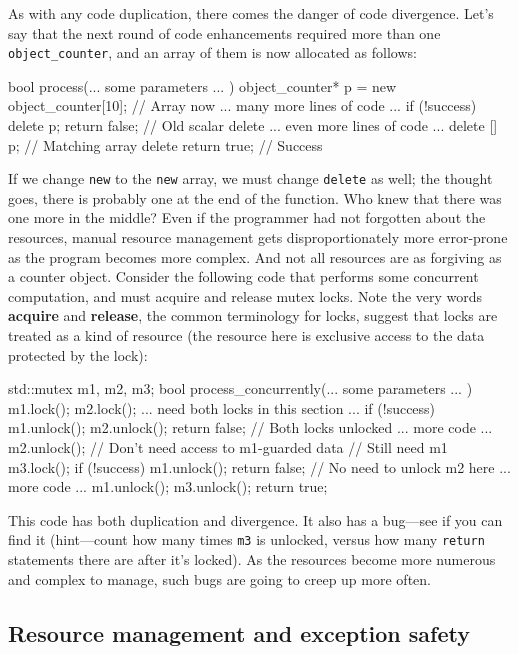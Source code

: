 As with any code duplication, there comes the danger of code divergence. Let's say that the next round of code enhancements required more than one \texttt{object\_counter}, and an array of them is now allocated as follows:

\begin{code}
bool process(... some parameters ... ) {
  object_counter* p = new object_counter[10]; // Array now
  ... many more lines of code ...
  if (!success) {
    delete p;
    return false;     // Old scalar delete
  }
  ... even more lines of code ...
  delete [] p;    // Matching array delete
  return true;    // Success
}
\end{code}

If we change \texttt{new} to the \texttt{new} array, we must change \texttt{delete} as well; the thought goes, there is probably one at the end of the function. Who knew that there was one more in the middle? Even if the programmer had not forgotten about the resources, manual resource management gets disproportionately more error-prone as the program becomes more complex. And not all resources are as forgiving as a counter object. Consider the following code that performs some concurrent computation, and must acquire and release mutex locks. Note the very words \textbf{acquire} and \textbf{release}, the common terminology for locks, suggest that locks are treated as a kind of resource (the resource here is exclusive access to the data protected by the lock):

\begin{code}
std::mutex m1, m2, m3;
bool process_concurrently(... some parameters ... ) {
  m1.lock();
  m2.lock();
  ... need both locks in this section ...
  if (!success) {
    m1.unlock();
    m2.unlock();
    return false;
  } // Both locks unlocked
  ... more code ...
  m2.unlock();    // Don't need access to m1-guarded data
                // Still need m1
  m3.lock();
  if (!success) {
    m1.unlock();
    return false;
  } // No need to unlock m2 here
  ... more code ...
  m1.unlock();
  m3.unlock();
  return true;
}
\end{code}

This code has both duplication and divergence. It also has a bug---see if you can find it (hint---count how many times \texttt{m3} is unlocked, versus how many \texttt{return} statements there are after it's locked). As the resources become more numerous and complex to manage, such bugs are going to creep up more often.

\subsection{Resource management and exception safety}

